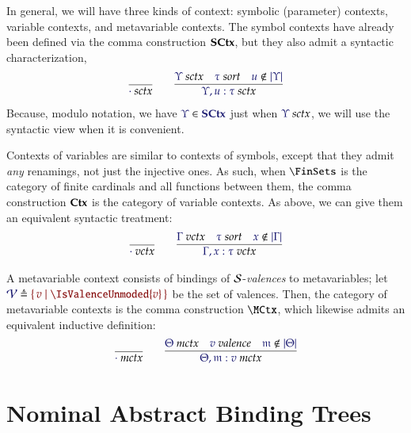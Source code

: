 In general, we will have three kinds of context: symbolic (parameter) contexts,
variable contexts, and metavariable contexts. The symbol contexts have already
been defined via the comma construction $\mathbf{SCtx}$, but they also admit a
syntactic characterization,
\begin{gather*}
  \infer{
    \IsSymCtx{\cdot}
  }{
  }
\qquad
  \infer{
    \IsSymCtx{\Upsilon,u:\tau}
  }{
    \IsSymCtx{\Upsilon}
&
    \IsSort{\tau}
&
    \NotIn{u}{\Dom\Upsilon}
  }
\end{gather*}
%
Because, modulo notation, we have $\Member{\Upsilon}{\SCtx}$ just when
$\IsSymCtx{\Upsilon}$, we will use the syntactic view when it is convenient.

Contexts of variables are similar to contexts of symbols, except that they
admit \emph{any} renamings, not just the injective ones. As such, when
$\FinSets$ is the category of finite cardinals and all functions between them, the
comma construction $\mathbf{Ctx}$ is the category of variable contexts. As above, we
can give them an equivalent syntactic treatment:
\begin{gather*}
  \infer{
    \IsVarCtx{\cdot}
  }{
  }
\qquad
  \infer{
    \IsVarCtx{\Gamma,x:\tau}
  }{
    \IsVarCtx{\Gamma}
&
    \IsSort{\tau}
&
    \NotIn{x}{\Dom\Gamma}
  }
\end{gather*}

A metavariable context consists of bindings of $\mathcal{S}$-\emph{valences} to
metavariables; let $\Define{\Valences}{\MkSet{v\mid \IsValenceUnmoded{v}}}$ be the set
of valences. Then, the category of metavariable contexts is the comma
construction $\MCtx$, which likewise admits an equivalent inductive definition:
\begin{gather*}
  \infer{
    \IsMetaCtx{\cdot}
  }{
  }
\qquad
  \infer{
    \IsMetaCtx{\Theta,\MV{m}:v}
  }{
    \IsMetaCtx{\Theta}
&
    \IsValence{v}
&
    \NotIn{\MV{m}}{\Dom\Theta}
  }
\end{gather*}



\section{Nominal Abstract Binding Trees}

